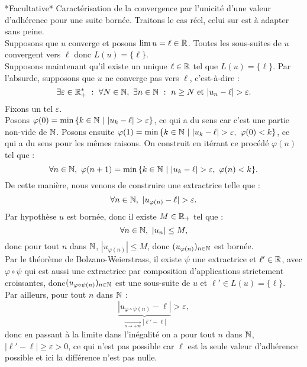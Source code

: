 \documentclass{article}
\renewenvironment{question_kholle}[2][ ]
{
	\subsection{\texorpdfstring{#2}{}}
	\notblank{#1}
	{
		\noindent #1
		\bigbreak
	}
	{}
	\begin{proof}
}
{
	\end{proof}
}
\begin{document}
	\begin{question_kholle}
	    {*Facultative* Caractérisation de la convergence par l'unicité d'une valeur d'adhérence pour une suite bornée.}
	    Traitons le cas réel, celui sur \C est à adapter sans peine.\\
	    Supposons que $u$ converge et posons $\lim u =\ell \in \mathbb R  $. Toutes les sous-suites de $u$ convergent vers $\ell$ donc $L(u)=\{\ell \}$. \\
	    Supposons maintenant qu'il existe un unique $\ell \in \mathbb R$ tel que $L(u) = \{ \ell \}$. Par l'absurde, supposons que $u$ ne converge pas vers $\ell$, c'est-à-dire : 
	    \[
	    \exists \varepsilon \in \mathbb R ^* _+ \ : \ \forall N \in \mathbb N, \ \exists n \in \mathbb N \ : \ n\geq N \text{ et } |u_n - \ell | > \varepsilon.
	    \]
	    Fixons un tel $\varepsilon$. \\
	    Posons $\varphi (0) = \min{ \{ k\in \N \ | \ |u_k - \ell| > \varepsilon \} }$, ce qui a du sens car c'est une partie non-vide de $\mathbb N$. Posons ensuite $\varphi (1) = \min{ \{ k\in \N \ | \ |u_k - \ell| > \varepsilon, \ \varphi(0) < k \} } $, ce qui a du sens pour les mêmes raisons. On construit en itérant ce procédé $\varphi (n)$ tel que : 
	    \[
	    \forall n \in \mathbb N, \ \varphi(n+1) = \min{ \{ k\in \ensuremath{\mathbb N} \ | \ |u_k - \ell| > \varepsilon, \ \varphi(n) < k \} }.
	    \]
	    De cette manière, nous venons de construire une extractrice telle que : 
	    \[
	    \forall n \in \N, \ |u_{\varphi(n)} - \ell| > \varepsilon.
	    \]
	    Par hypothèse $u$ est bornée, donc il existe $M\in \mathbb R _+$ tel que : 
	    \[
	    \forall n \in \mathbb N, \ |u_n| \leq M,
	    \]
	    donc pour tout $n$ dans $\mathbb N$, $|u_{\varphi(n)}| \leq M$, donc $(u_{\varphi(n)})_{n\in \mathbb N}$ est bornée. \\
	    Par le théorème de Bolzano-Weierstrass, il existe $\psi$ une extractrice et $\ell ' \in \mathbb R$, avec $\varphi \circ \psi$ qui est aussi une extractrice par composition d'applications strictement croissantes, donc$(u_{\varphi \circ \psi (n)})_{n\in \mathbb N}$ est une sous-suite de $u$ et $\ell ' \in L(u) = \{ \ell \}$.\\
	    Par ailleurs, pour tout $n$ dans $\mathbb N$ :
	    \[
	    \underset{\xrightarrow[n\to +\infty]{}|\ell' -\ell|}{\underbrace{|u_{\varphi \circ \psi (n)} - \ell|}} > \varepsilon,
	    \]
	    donc en passant à la limite dans l'inégalité on a pour tout $n$ dans $\mathbb N$, $|\ell ' - \ell | \geq \varepsilon > 0$, ce qui n'est pas possible car $\ell$ est la seule valeur d'adhérence possible et ici la différence n'est pas nulle.
	\end{question_kholle}
\end{document}
